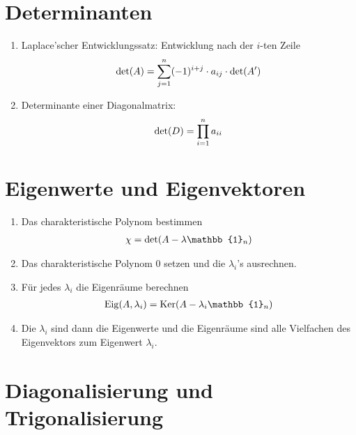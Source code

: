 \documentclass[ngerman,a4paper]{article}
\DeclareMathOperator{\Eig}{Eig}
\DeclareMathOperator{\Ker}{Ker}
\begin{document}
\section{Determinanten}
\begin{enumerate}[label=\textbf{\arabic*.}]
	\item Laplace'scher Entwicklungssatz: Entwicklung nach der $i$-ten Zeile
	\begin{align}
		\det(A) = \sum_{j=1}^n (-1)^{i+j}\cdot a_{ij}\cdot\det(A')\notag
	\end{align}
	\item Determinante einer Diagonalmatrix:
	\begin{align}
		\det(D) = \prod_{i=1}^n a_{ii}\notag
	\end{align}
\end{enumerate}

\section{Eigenwerte und Eigenvektoren}
\begin{enumerate}[label=\textbf{\arabic*.}]
	\item Das charakteristische Polynom bestimmen
	\begin{align}
		\chi = \det(A-\lambda\mathbb{1}_n)\notag
	\end{align}
	\item Das charakteristische Polynom 0 setzen und die $\lambda_i$'s ausrechnen.
	\item F\"ur jedes $\lambda_i$ die Eigenr\"aume berechnen
	\begin{align}
		\Eig(A,\lambda_i) = \Ker(A-\lambda_i\mathbb{1}_n)\notag
	\end{align}
	\item Die $\lambda_i$ sind dann die Eigenwerte und die Eigenr\"aume sind alle Vielfachen des Eigenvektors zum Eigenwert $\lambda_i$.
\end{enumerate}

\section{Diagonalisierung und Trigonalisierung}
\end{document}
